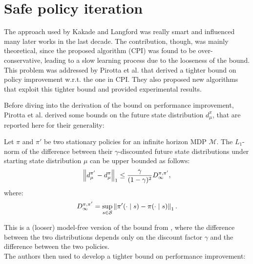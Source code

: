 \section{Safe policy iteration}
\label{sec:spi}
The approach used by Kakade and Langford was really smart and influenced many later works in the last decade. The contribution, though, was mainly theoretical, since the proposed algorithm (CPI) was found to be over-conservative, leading to a slow learning process due to the looseness of the bound. \\
This problem was addressed by Pirotta et al. \cite{safe_iteration} that derived a tighter bound on policy improvement w.r.t. the one in CPI. They also proposed new algorithms that exploit this tighter bound and provided experimental results.

Before diving into the derivation of the bound on performance improvement, Pirotta et al. derived some bounds on the future state distribution $d_{\mu}^{\pi}$, that are reported here for their generality:

\begin{theorem}
Let $\pi$ and $\pi'$ be two stationary policies for an infinite horizon MDP $\mathcal{M}$. The $L_1$-norm of the difference between their $\gamma$-discounted future state distributions under starting state distribution $\mu$ can be upper bounded as follows:
\begin{equation}
\left\| d_{\mu}^{\pi'} - d_{\mu}^{\pi} \right\|_{1} \leq \frac{\gamma}{(1-\gamma)^2}D_\infty^{\pi, \pi'},
\end{equation}
where:
\begin{equation}
D_\infty^{\pi, \pi'} = \sup_{s\in\mathcal{S}}\left\| \pi'(\cdot\mid s) - \pi(\cdot \mid s) \right\|_{1}.
\end{equation}
\end{theorem}

This is a (looser) model-free version of the bound from \cite{safe_iteration}, where the difference between the two distributions depends only on the discount factor $\gamma$ and the difference between the two policies. \\
The authors then used  to develop a tighter bound on performance improvement:

